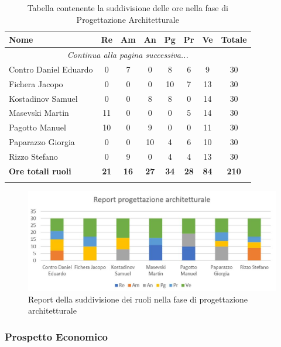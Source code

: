 \documentclass[../piano_di_progetto.tex]{subfiles}
\begin{document}
\begin{center}
	\begin{longtable}{|l|c|c|c|c|c|c|c|}
		\hline
		\rowcolor{lightgray}
		\textbf{Nome} & \textbf{Re} & \textbf{Am} & \textbf{An} & \textbf{Pg}  & \textbf{Pr}   & \textbf{Ve} & \textbf{Totale} \\
		\hline
		\endhead
		
		\hline
		\multicolumn{8}{|c|}{\emph{Continua alla pagina successiva...}}\\
		\hline
		\endfoot

		\endlastfoot
		
		\hline
			Contro Daniel Eduardo & 0 & 7 & 0 & 8 & 6 & 9 & 30\\
			Fichera Jacopo & 0 & 0 & 0 & 10 & 7 & 13 & 30 \\
			Kostadinov Samuel & 0 & 0 & 8 & 8 & 0 & 14 & 30 \\			
			Masevski Martin 	& 11 & 0 & 0 & 0 & 5 & 14 & 30\\
			Pagotto Manuel & 10 & 0 & 9 & 0 & 0 & 11 & 30 \\			
			Paparazzo Giorgia & 0 & 0 & 10 & 4 & 6 & 10 & 30 \\
			Rizzo Stefano & 0 & 9 & 0 & 4 & 4 & 13 & 30\\
			\hline
		\textbf{Ore totali ruoli} & \textbf{21} & \textbf{16} & \textbf{27} & \textbf{34} & \textbf{28} & \textbf{84} & \textbf{210} \\
		\hline	
		\rowcolor{white}
		\caption{Tabella contenente la suddivisione delle ore nella fase di Progettazione Architetturale}
	\end{longtable}
\end{center}

\begin{figure}[H]
\centering
\includegraphics[width=12cm]{src/img/report/report_prog_arc}
\caption{Report della suddivisione dei ruoli nella fase di progettazione architetturale}
\end{figure}

\subsubsection{Prospetto Economico}
\end{document}
